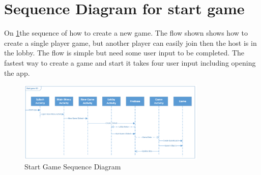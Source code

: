 \section{Sequence Diagram for start game}

On \ref{SequenceDiagram}the sequence of how to create a new game. The flow shown shows how to create a single player game, but another player can easily join then the host is in the lobby. The flow is simple but need some user input to be completed. The fastest way to create a game and start it takes four user input including opening the app.

\begin{figure}
	\centering
	\includegraphics[width=0.8\textwidth]{images/Start_Game_Sequence_Diagram.png}
	\caption{Start Game Sequence Diagram \label{SequenceDiagram}}
\end{figure}